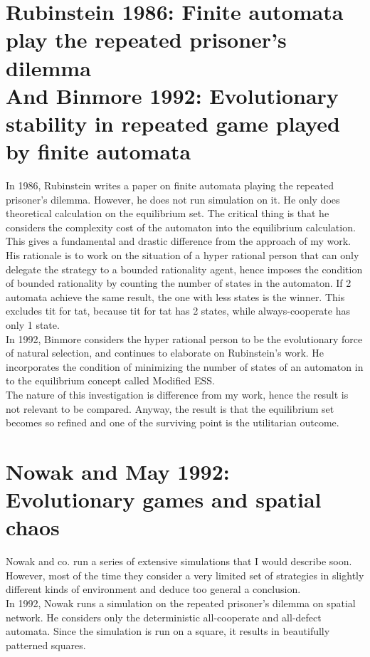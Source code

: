 \documentclass[12.5pt]{report}
\begin{document}
\section{Rubinstein 1986: Finite automata play the repeated prisoner’s dilemma\\
And Binmore 1992: Evolutionary stability in repeated game played by finite automata}

In 1986, Rubinstein writes a paper on finite automata playing the repeated prisoner’s dilemma. However, he does not run simulation on it. He only does theoretical calculation on the equilibrium set. The critical thing is that he considers the complexity cost of the automaton into the equilibrium calculation. This gives a fundamental and drastic difference from the approach of my work. His rationale is to work on the situation of a hyper rational person that can only delegate the strategy to a bounded rationality agent, hence imposes the condition of bounded rationality by counting the number of states in the automaton. If 2 automata achieve the same result, the one with less states is the winner. This excludes tit for tat, because tit for tat has 2 states, while always-cooperate has only 1 state. \\

In 1992, Binmore considers the hyper rational person to be the evolutionary force of natural selection, and continues to elaborate on Rubinstein’s work. He incorporates the condition of minimizing the number of states of an automaton in to the equilibrium concept called Modified ESS.\\

The nature of this investigation is difference from my work, hence the result is not relevant to be compared. Anyway, the result is that the equilibrium set becomes so refined and one of the surviving point is the utilitarian outcome.

\section{Nowak and May 1992: Evolutionary games and spatial chaos}

Nowak and co. run a series of extensive simulations that I would describe soon. However, most of the time they consider a very limited set of strategies in slightly different kinds of environment and deduce too general a conclusion.\\

In 1992, Nowak runs a simulation on the repeated prisoner’s dilemma on spatial network. He considers only the deterministic all-cooperate and all-defect automata. Since the simulation is run on a square, it results in beautifully patterned squares.\\
\end{document}
